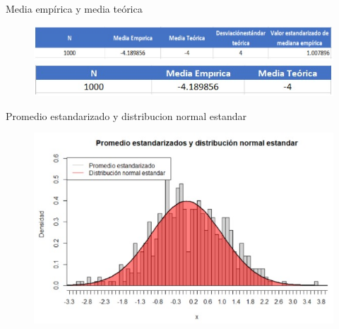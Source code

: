 \documentclass{beamer}
\begin{document}
\begin{frame}{Media empírica y media teórica}
\begin{figure}[htpb]
        \begin{center}
            \includegraphics[width=0.8\linewidth]{pic/ej3_tabla1.jpeg}
            \includegraphics[width=0.8\linewidth]{pic/ej3_tabla2.jpeg}
        \end{center}
    \end{figure}
    
\end{frame}
\begin{frame}{Promedio estandarizado y distribucion normal estandar}
\begin{figure}[htpb]
        \begin{center}
            \includegraphics[width=0.8\linewidth]{pic/ej3_gauss.jpeg}
        \end{center}
    \end{figure}
    
\end{frame}
\end{document}
